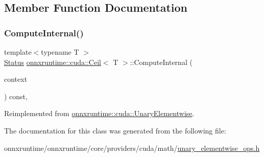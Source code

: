 \subsection{Member Function Documentation}
\mbox{\label{classonnxruntime_1_1cuda_1_1Ceil_a9126a17817969afaf0c4bcf827907782}} 
\subsubsection{\texorpdfstring{Compute\+Internal()}{ComputeInternal()}}
{\footnotesize\ttfamily template$<$typename T $>$ \\
\mbox{\hyperlink{classonnxruntime_1_1common_1_1Status}{Status}} \mbox{\hyperlink{classonnxruntime_1_1cuda_1_1Ceil}{onnxruntime\+::cuda\+::\+Ceil}}$<$ T $>$\+::Compute\+Internal (\begin{DoxyParamCaption}\item[{\mbox{\hyperlink{classonnxruntime_1_1OpKernelContext}{Op\+Kernel\+Context}} $\ast$}]{context }\end{DoxyParamCaption}) const\hspace{0.3cm}{\ttfamily [override]}, {\ttfamily [virtual]}}



Reimplemented from \mbox{\hyperlink{classonnxruntime_1_1cuda_1_1UnaryElementwise_abbbcb29c3937e2ac9e2ad768d9c69fca}{onnxruntime\+::cuda\+::\+Unary\+Elementwise}}.



The documentation for this class was generated from the following file\+:\begin{DoxyCompactItemize}
\item 
onnxruntime/onnxruntime/core/providers/cuda/math/\mbox{\hyperlink{unary__elementwise__ops_8h}{unary\+\_\+elementwise\+\_\+ops.\+h}}\end{DoxyCompactItemize}
